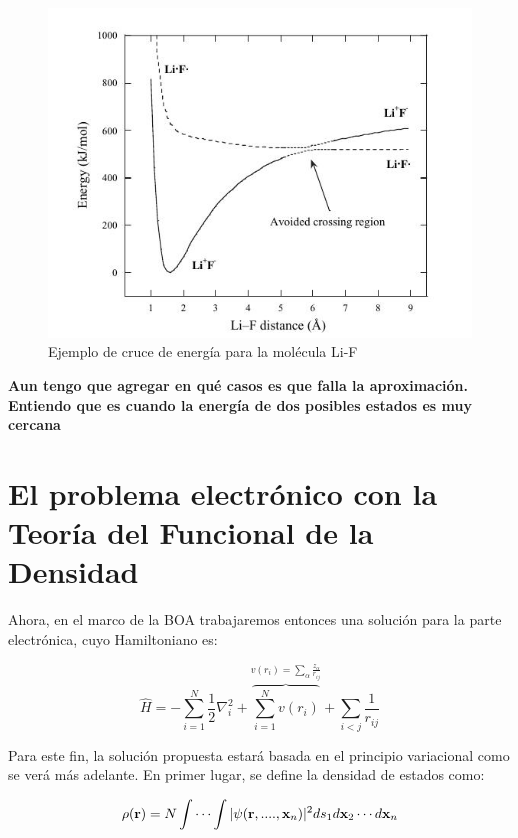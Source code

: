 \documentclass [11pt]{article}
\begin{document}
\begin{figure}[t]
\centering
\includegraphics[width=0.7\linewidth]{cross_energy}
\caption{Ejemplo de cruce de energía para la molécula Li-F}
\label{cross}
\end{figure}
{\bf \color{blue}  Aun tengo que agregar en qué casos es que falla la aproximación. Entiendo que es cuando la energía de dos posibles estados es muy cercana}
\section{El problema electrónico con la Teoría del Funcional de la Densidad}

Ahora, en el marco de la BOA trabajaremos entonces una solución para la parte electrónica, cuyo Hamiltoniano es:

\begin{equation}
	\hat{H}=-\sum_{i=1}^{N}\frac{1}{2}\nabla_i^2+\overbrace{\sum_{i=1}^{N}v(r_i)}^{v(r_i)=\sum_{\alpha}\frac{z_\alpha}{r_{ij}}}+\sum_{i<j} \frac{1}{r_{ij}}
\end{equation}

Para este fin, la solución propuesta estará basada en el principio variacional como se verá más adelante. En primer lugar, se define la densidad de estados como:

\begin{equation}
	\rho({\bf r})=N\int\cdots\int |\psi({\bf r},....,{\bf x} _n)|^2 ds_1 d{\bf x}_2\cdots d{\bf x}_n
\end{equation}
\end{document}
